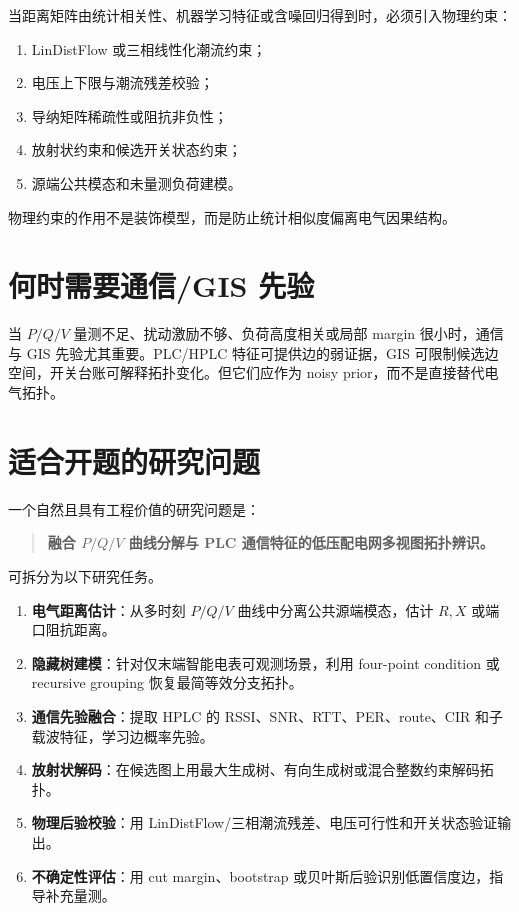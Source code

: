 当距离矩阵由统计相关性、机器学习特征或含噪回归得到时，必须引入物理约束：
\begin{enumerate}[label=(\arabic*)]
  \item LinDistFlow 或三相线性化潮流约束；
  \item 电压上下限与潮流残差校验；
  \item 导纳矩阵稀疏性或阻抗非负性；
  \item 放射状约束和候选开关状态约束；
  \item 源端公共模态和未量测负荷建模。
\end{enumerate}
物理约束的作用不是装饰模型，而是防止统计相似度偏离电气因果结构。

\section{何时需要通信/GIS 先验}

当 $P/Q/V$ 量测不足、扰动激励不够、负荷高度相关或局部 margin 很小时，通信与 GIS 先验尤其重要。PLC/HPLC 特征可提供边的弱证据，GIS 可限制候选边空间，开关台账可解释拓扑变化。但它们应作为 noisy prior，而不是直接替代电气拓扑。

\section{适合开题的研究问题}

一个自然且具有工程价值的研究问题是：

\begin{quote}
\textbf{融合 $P/Q/V$ 曲线分解与 PLC 通信特征的低压配电网多视图拓扑辨识。}
\end{quote}

可拆分为以下研究任务。
\begin{enumerate}[label=(\arabic*)]
  \item \textbf{电气距离估计}：从多时刻 $P/Q/V$ 曲线中分离公共源端模态，估计 $R,X$ 或端口阻抗距离。
  \item \textbf{隐藏树建模}：针对仅末端智能电表可观测场景，利用 four-point condition 或 recursive grouping 恢复最简等效分支拓扑。
  \item \textbf{通信先验融合}：提取 HPLC 的 RSSI、SNR、RTT、PER、route、CIR 和子载波特征，学习边概率先验。
  \item \textbf{放射状解码}：在候选图上用最大生成树、有向生成树或混合整数约束解码拓扑。
  \item \textbf{物理后验校验}：用 LinDistFlow/三相潮流残差、电压可行性和开关状态验证输出。
  \item \textbf{不确定性评估}：用 cut margin、bootstrap 或贝叶斯后验识别低置信度边，指导补充量测。
\end{enumerate}

